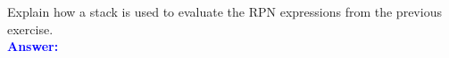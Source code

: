 \item{}
Explain how a stack is used to evaluate the RPN expressions from the previous
exercise.\\[12pt]
\ifanswers
\textcolor{blue}{
\textbf{Answer:}\\
}
\newpage
\fi
